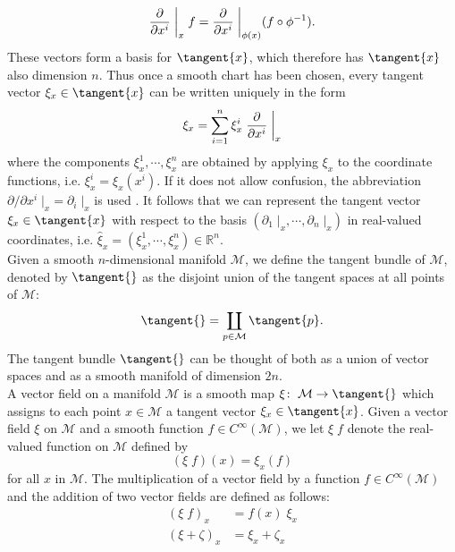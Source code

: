 \begin{equation*}
    \frac{\partial}{\partial x^i} \; \bigg{\vert}_x \; f = \frac{\partial}{\partial x^i} \; \bigg{\vert}_{\phi(x)} (f \circ \phi^{-1}).
\end{equation*}
These vectors form a basis for $\tangent{x}$, which therefore has $\tangent{x}$ also dimension $n$. Thus once a smooth chart has been chosen, every tangent vector $\xi_x \in \tangent{x}$ can be written uniquely in the form
\begin{equation*}
    \xi_x = \sum^{n}_{i = 1} \xi^{i}_x \; \frac{\partial}{\partial x^i} \; \bigg{\vert}_x
\end{equation*}
where the components $\xi^{1}_x, \cdots, \xi^{n}_x$ are obtained by applying $\xi_x$ to the coordinate functions, i.e. $\xi^{i}_x = \xi_x(x^i)$. If it does not allow confusion, the abbreviation $\partial / \partial x^i \; \vert_x = \partial_i \; \vert_x$ is used \cite[p.~376-377]{Lee:2019}. It follows that we can represent the tangent vector $\xi_x \in \tangent{x}$ with respect to the basis $(\partial_1 \; \vert_x, \cdots, \partial_n \; \vert_x)$ in real-valued coordinates, i.e. $\hat{\xi}_x = (\xi^{1}_x, \cdots, \xi^{n}_x) \in \mathbb{R}^n$. \\
Given a smooth $n$-dimensional manifold $\mathcal{M}$, we define the tangent bundle of $\mathcal{M}$, denoted by $\tangent{}$ as the disjoint union of the tangent spaces at all points of $\mathcal{M}$:
\begin{equation*}
    \tangent{} = \coprod_{p \in \mathcal{M}} \tangent{p}.
\end{equation*}
The tangent bundle $\tangent{}$ can be thought of both as a union of vector spaces and as a smooth manifold of dimension $2n$. \\
A vector field on a manifold $\mathcal{M}$ is a smooth map $\xi \colon \; \mathcal{M} \to \tangent{}$ which assigns to each point $x \in \mathcal{M}$ a tangent vector $\xi_x \in \tangent{x}$. Given a vector field $\xi$ on $\mathcal{M}$ and a smooth function $f \in C^{\infty}(\mathcal{M})$, we let $\xi \; f$ denote the real-valued function on $\mathcal{M}$ defined by
\begin{equation*}
    (\xi \; f)(x) = \xi_x (f)
\end{equation*}
for all $x$ in $\mathcal{M}$. The multiplication of a vector field by a function $f \in C^{\infty}(\mathcal{M})$ and the addition of two vector fields are defined as follows:
\begin{align*}
    (\xi \; f)_x & = f(x) \; \xi_x \\
    (\xi + \zeta)_x & = \xi_x + \zeta_x
\end{align*}
